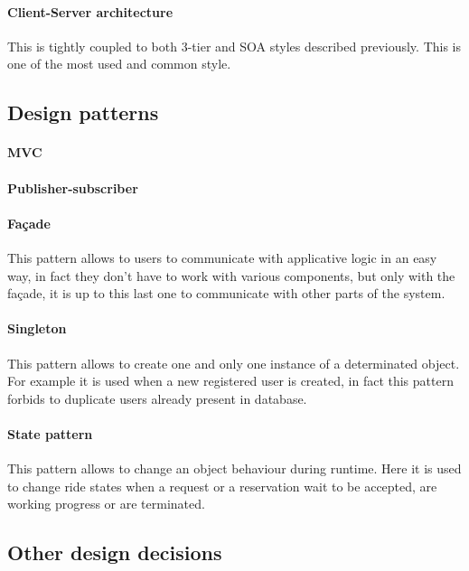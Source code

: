 \paragraph{Client-Server architecture}
This is tightly coupled to both 3-tier and SOA styles described previously. This is one of the most used and common style.
\subsection{Design patterns}
\paragraph{MVC}
\paragraph{Publisher-subscriber}
\paragraph{Fa\c{c}ade}
This pattern allows to users to communicate with applicative logic in an easy way, in fact they don't have to work with various components, but only with the fa\c{c}ade, it is up to this last one to communicate with other parts of the system.
\paragraph{Singleton}
This pattern allows to create one and only one instance of a determinated object. For example it is used when a new registered user is created, in fact this pattern forbids to duplicate users already present in database. 
\paragraph{State pattern}
This pattern allows to change an object behaviour during runtime. Here it is used to change ride states when a request or a reservation wait to be accepted, are working progress or are terminated.
\subsection{Other design decisions}